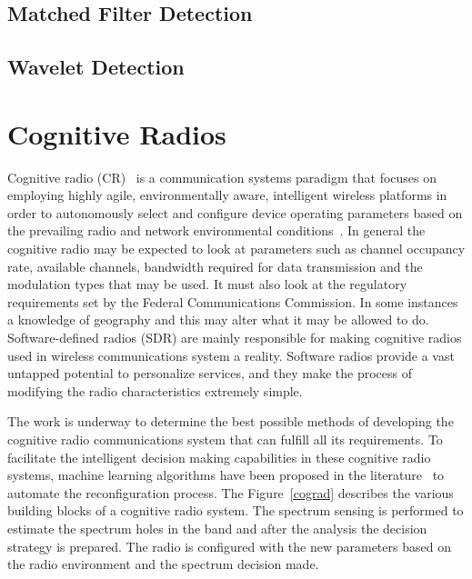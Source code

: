 \subsection{Matched Filter Detection}


\subsection{Wavelet Detection}

\section{Cognitive Radios}
Cognitive radio (CR)~\cite{cogjm} is a communication systems paradigm that focuses on employing highly agile, environmentally aware, intelligent wireless platforms in
order to autonomously select and configure device operating parameters based on the prevailing radio and network environmental conditions~\cite{bookhtn1}. In general the cognitive radio may be expected to look at parameters such as channel occupancy rate, available channels, bandwidth required for data transmission and the modulation types that may be used. It must also look at the regulatory requirements set by the Federal Communications Commission. In some instances a knowledge of geography and this may alter what it may be allowed to do. Software-defined radios (SDR) are mainly responsible for making cognitive radios used in wireless communications system a reality. Software radios provide a vast untapped potential to personalize services, and they make the process of modifying the radio characteristics extremely simple. 

The work is underway to determine the best possible methods of developing the cognitive radio communications system that can fulfill all its requirements. To facilitate the intelligent decision making capabilities in these cognitive radio systems, machine learning algorithms have been proposed in the literature~\cite{barker2008mission,haykin2005cognitive,newman2007cognitive,newman2008population} to automate the reconfiguration process. The Figure~\ref{cograd} describes the various building blocks of a cognitive radio system. The spectrum sensing is performed to estimate the spectrum holes in the band and after the analysis the decision strategy is prepared. The radio is configured with the new parameters based on the radio environment and the spectrum decision made.  

